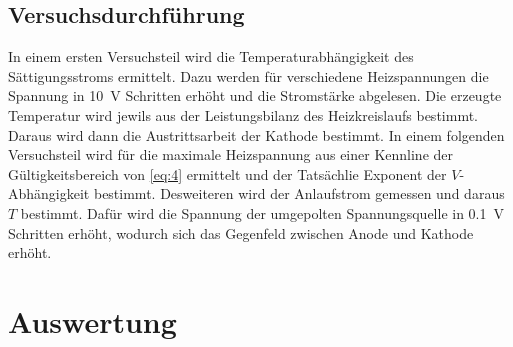 \subsection{Versuchsdurchführung}
In einem ersten Versuchsteil wird die Temperaturabhängigkeit des Sättigungsstroms ermittelt.
Dazu werden für verschiedene Heizspannungen die Spannung in \SI{10}{\volt} Schritten
erhöht und die Stromstärke abgelesen.
Die erzeugte Temperatur wird jewils aus der Leistungsbilanz des Heizkreislaufs bestimmt.
Daraus wird dann die Austrittsarbeit der Kathode bestimmt.
In einem folgenden Versuchsteil wird für die maximale Heizspannung
aus einer Kennline der Gültigkeitsbereich von \eqref{eq:4} ermittelt und der
Tatsächlie Exponent der $V$-Abhängigkeit bestimmt. Desweiteren wird der Anlaufstrom
gemessen und daraus $T$ bestimmt. Dafür wird die Spannung der umgepolten Spannungsquelle
in \SI{0.1}{\volt} Schritten erhöht, wodurch sich das Gegenfeld zwischen Anode und Kathode
erhöht.

\section{Auswertung}
